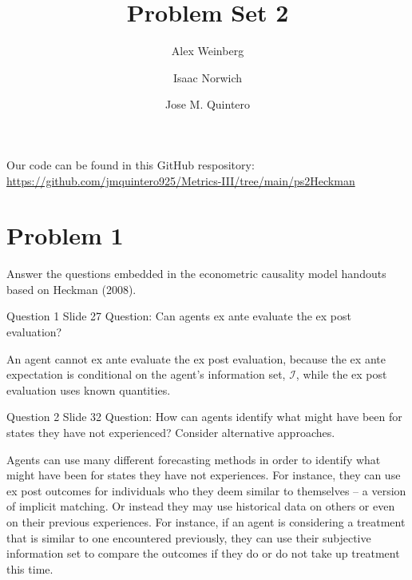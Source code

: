 \documentclass{article}
\title{Problem Set 2}
\author{Alex Weinberg \and Isaac Norwich \and Jose M. Quintero}
\begin{document}
\maketitle

Our code can be found in this GitHub respository: \url{https://github.com/jmquintero925/Metrics-III/tree/main/ps2Heckman}


\section*{Problem 1}
Answer the questions embedded in the econometric causality model handouts based on Heckman (2008).

\begin{problem}{Question 1 Slide 27}
Question: Can agents ex ante evaluate the ex post evaluation?
\end{problem}
\begin{solution}
An agent cannot ex ante evaluate the ex post evaluation, because the ex ante expectation is conditional on the agent's information set, $\mathcal{I}$, while the ex post evaluation uses known quantities.
\end{solution}


\begin{problem}{Question 2 Slide 32}
Question: How can agents identify what might have been for states they have not experienced? Consider alternative approaches.
\end{problem}
\begin{solution}
Agents can use many different forecasting methods in order to identify what might have been for states they have not experiences. For instance, they can use ex post outcomes for individuals who they deem similar to themselves -- a version of implicit matching. Or instead they may use historical data on others or even on their previous experiences. For instance, if an agent is considering a treatment that is similar to one encountered previously, they can use their subjective information set to compare the outcomes if they do or do not take up treatment this time.
\end{solution}
 
\end{document}
